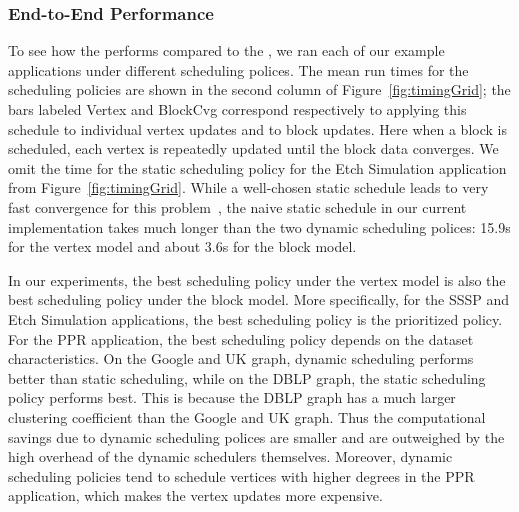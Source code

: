 \subsubsection{End-to-End Performance}
To see how the {\BlkModel} performs compared to the {\VtxModel}, we
ran each of our example applications under different scheduling
polices.  The mean run times for the scheduling policies are shown 
in the second column of Figure~\ref{fig:timingGrid}; the bars
labeled Vertex and BlockCvg correspond respectively to applying this
schedule to individual vertex updates and to block updates.
%
%
%
Here when a block is scheduled, 
each vertex is repeatedly updated until the block data converges.
We omit the time for the static scheduling policy for the Etch
Simulation application from
Figure~\ref{fig:timingGrid}.
%
While a well-chosen static schedule leads to very fast convergence for
this problem~\cite{Zhao07:ParallelSweep}, the naive static schedule in
our current implementation takes much longer than the two dynamic
scheduling polices: 15.9s for the vertex model and about 3.6s for the block model.

In our experiments,
the best
scheduling policy under the vertex model is also the best scheduling
policy under the block model. More specifically, for the SSSP and Etch
Simulation applications, the best scheduling policy is the prioritized
policy.  
For the PPR application, the best scheduling policy depends
on the dataset characteristics.  
%
%
On the Google and UK graph, dynamic scheduling performs better than static
scheduling, while on the DBLP graph, the static scheduling policy
performs best.  This is because the DBLP graph has a much larger
clustering coefficient than the Google and UK graph.
%
Thus the computational savings due to dynamic scheduling polices are
smaller and are outweighed by the high overhead of the dynamic
schedulers themselves.  Moreover, dynamic scheduling policies tend to
schedule vertices with higher degrees in the PPR application, which
makes the vertex updates more expensive.


